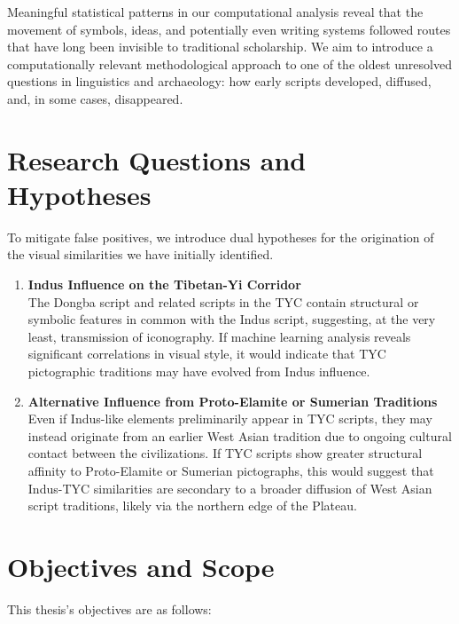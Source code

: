 \documentclass[11pt,a4paper,oneside]{report}
\begin{document}
Meaningful statistical patterns in our computational analysis reveal that the movement of symbols, ideas, and potentially even writing systems followed routes that have long been invisible to traditional scholarship. We aim to introduce a computationally relevant methodological approach to one of the oldest unresolved questions in linguistics and archaeology: how early scripts developed, diffused, and, in some cases, disappeared.

\section{Research Questions and Hypotheses}
\noindent\hspace{1cm}
To mitigate false positives, we introduce dual hypotheses for the origination of the visual similarities we have initially identified.

\begin{enumerate}[label=\textbf{Hypothesis \arabic*:}, leftmargin=*, labelsep=1em]
    \item \textbf{Indus Influence on the Tibetan-Yi Corridor}\\
    The Dongba script and related scripts in the TYC contain structural or symbolic features in common with the Indus script, suggesting, at the very least, transmission of iconography. If machine learning analysis reveals significant correlations in visual style, it would indicate that TYC pictographic traditions may have evolved from Indus influence.

    \item \textbf{Alternative Influence from Proto-Elamite or Sumerian Traditions}\\
    Even if Indus-like elements preliminarily appear in TYC scripts, they may instead originate from an earlier West Asian tradition due to ongoing cultural contact between the civilizations. If TYC scripts show greater structural affinity to Proto-Elamite or Sumerian pictographs, this would suggest that Indus-TYC similarities are secondary to a broader diffusion of West Asian script traditions, likely via the northern edge of the Plateau.
\end{enumerate}

\section{Objectives and Scope}
This thesis's objectives are as follows:
\end{document}
